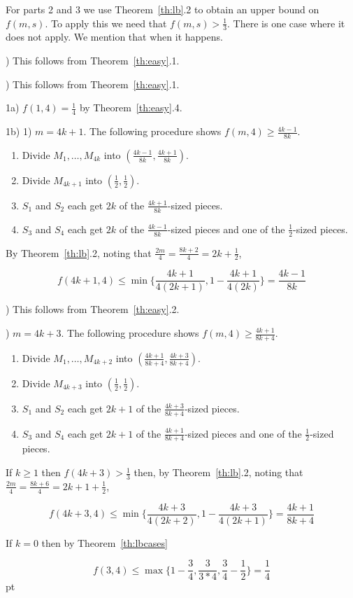 \documentclass[12pt]{article}
\newenvironment{proof}
    {\pagebreak[1]{\narrower\noindent {\bf Proof:\quad\nopagebreak}}}{\QED}
\newcommand{\yyskip}{\penalty-50\vskip 5pt plus 3pt minus 2pt}
\newcommand{\blackslug}{\hbox{\hskip 1pt
        \vrule width 4pt height 8pt depth 1.5pt\hskip 1pt}}
\newcommand{\QED}{{\penalty10000\parindent 0pt\penalty10000
        \hskip 8 pt\nolinebreak\blackslug\hfill\lower 8.5pt\null}
        \par\yyskip\pagebreak[1]}
\begin{document}
\begin{proof}

For parts 2 and 3 we use 
Theorem~\ref{th:lb}.2 to obtain an upper bound on $f(m,s)$.
To apply this we need that $f(m,s)>\frac{1}{3}$. 
There is one case where it does not apply. We mention that when it happens.

) This follows from Theorem~\ref{th:easy}.1.

) This follows from Theorem~\ref{th:easy}.1.

\bigskip

\noindent
1a) $f(1,4)=\frac{1}{4}$ by Theorem~\ref{th:easy}.4.

\noindent
1b) 1) $m=4k+1$. The following procedure shows $f(m,4) \ge \frac{4k-1}{8k}$.

\begin{enumerate}
\item
Divide $M_1,\ldots,M_{4k}$ into $(\frac{4k-1}{8k},\frac{4k+1}{8k})$.
\item
Divide $M_{4k+1}$ into $(\frac{1}{2},\frac{1}{2})$.
\item
$S_1$ and $S_2$ each get $2k$ of the $\frac{4k+1}{8k}$-sized pieces.
\item
$S_3$ and $S_4$ each get $2k$ of the $\frac{4k-1}{8k}$-sized pieces and one of the $\frac{1}{2}$-sized pieces.
\end{enumerate}

By Theorem~\ref{th:lb}.2, noting that 
$\frac{2m}{4}=\frac{8k+2}{4}= 2k + \frac{1}{2}$,


$$f(4k+1,4) \le  \min\biggl \{
\frac{4k+1}{4(2k+1)},
1-\frac{4k+1}{4(2k)}
\biggr \}
=
\frac{4k-1}{8k}
$$

\bigskip

) This follows from Theorem~\ref{th:easy}.2.

\bigskip


) $m=4k+3$. 
The following procedure shows $f(m,4)\ge \frac{4k+1}{8k+4}$.

\begin{enumerate}
\item
Divide $M_1,\ldots,M_{4k+2}$ into $(\frac{4k+1}{8k+4},\frac{4k+3}{8k+4})$.
\item
Divide $M_{4k+3}$ into $(\frac{1}{2},\frac{1}{2})$.
\item
$S_1$ and $S_2$ each get $2k+1$ of the $\frac{4k+3}{8k+4}$-sized pieces.
\item
$S_3$ and $S_4$ each get $2k+1$ of the $\frac{4k+1}{8k+4}$-sized pieces and one of 
the $\frac{1}{2}$-sized pieces.
\end{enumerate}

If $k\ge 1$ then $f(4k+3)>\frac{1}{3}$ then,
by Theorem~\ref{th:lb}.2,  
noting that $\frac{2m}{4}=\frac{8k+6}{4} = 2k+1+\frac{1}{2}$,


$$f(4k+3,4) \le  \min\biggl \{
\frac{4k+3}{4(2k+2)},
1-\frac{4k+3}{4(2k+1)}
\biggr \}
=
\frac{4k+1}{8k+4}
$$

If $k=0$ then by Theorem~\ref{th:lbcases}

$$f(3,4) \le 
\max
\biggl \{
1-\frac{3}{4}, \frac{3}{3*4}, \frac{3}{4}-\frac{1}{2}
\biggr \} = \frac{1}{4}
$$
\end{proof}
\end{document}
